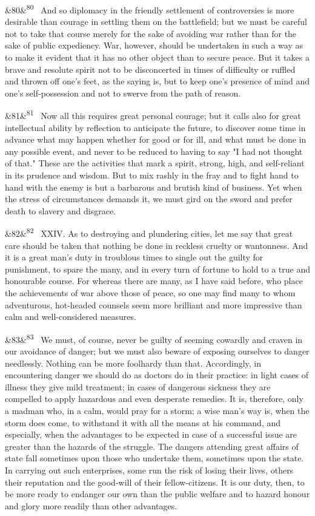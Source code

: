 \documentclass[12pt]{article}
\newcommand{\para}[1][]{\par\noindent\ifx&#1&\else\textsuperscript{\footnotesize #1}~\fi}
\begin{document}
\para[80] And so diplomacy in the friendly settlement of controversies is more desirable than courage in settling them on the battlefield; but we must be careful not to take that course merely for the sake of avoiding war rather than for the sake of public expediency. War, however, should be undertaken in such a way as to make it evident that it has no other object than to secure peace. But it takes a brave and resolute spirit not to be disconcerted in times of difficulty or ruffled and thrown off one's feet, as the saying is, but to keep one's presence of mind and one's self-possession and not to swerve from the path of reason.

\para[81] Now all this requires great personal courage; but it calls also for great intellectual ability by reflection to anticipate the future, to discover some time in advance what may happen whether for good or for ill, and what must be done in any possible event, and never to be reduced to having to say "I had not thought of that." These are the activities that mark a spirit, strong, high, and self-reliant in its prudence and wisdom. But to mix rashly in the fray and to fight hand to hand with the enemy is but a barbarous and brutish kind of business. Yet when the stress of circumstances demands it, we must gird on the sword and prefer death to slavery and disgrace.

\para[82] XXIV. As to destroying and plundering cities, let me say that great care should be taken that nothing be done in reckless cruelty or wantonness. And it is a great man's duty in troublous times to single out the guilty for punishment, to spare the many, and in every turn of fortune to hold to a true and honourable course. For whereas there are many, as I have said before, who place the achievements of war above those of peace, so one may find many to whom adventurous, hot-headed counsels seem more brilliant and more impressive than calm and well-considered measures.

\para[83] We must, of course, never be guilty of seeming cowardly and craven in our avoidance of danger; but we must also beware of exposing ourselves to danger needlessly. Nothing can be more foolhardy than that. Accordingly, in encountering danger we should do as doctors do in their practice: in light cases of illness they give mild treatment; in cases of dangerous sickness they are compelled to apply hazardous and even desperate remedies. It is, therefore, only a madman who, in a calm, would pray for a storm; a wise man's way is, when the storm does come, to withstand it with all the means at his command, and especially, when the advantages to be expected in case of a successful issue are greater than the hazards of the struggle. The dangers attending great affairs of state fall sometimes upon those who undertake them, sometimes upon the state. In carrying out such enterprises, some run the risk of losing their lives, others their reputation and the good-will of their fellow-citizens. It is our duty, then, to be more ready to endanger our own than the public welfare and to hazard honour and glory more readily than other advantages.
\end{document}
